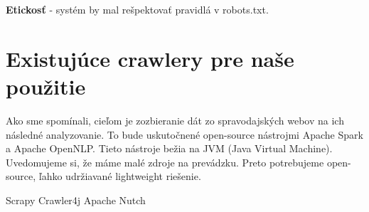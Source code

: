 \textbf{Etickosť} - systém by mal rešpektovať pravidlá v robots.txt.


\section{Existujúce crawlery pre naše použitie} 

Ako sme spomínali, cieľom je zozbieranie dát zo spravodajských webov na ich následné analyzovanie. To bude uskutočnené open-source nástrojmi Apache Spark a Apache OpenNLP. Tieto nástroje bežia na JVM (Java Virtual Machine). Uvedomujeme si, že máme malé zdroje na prevádzku. Preto potrebujeme open-source, ľahko udržiavané lightweight riešenie.

Scrapy 
Crawler4j
Apache Nutch 

